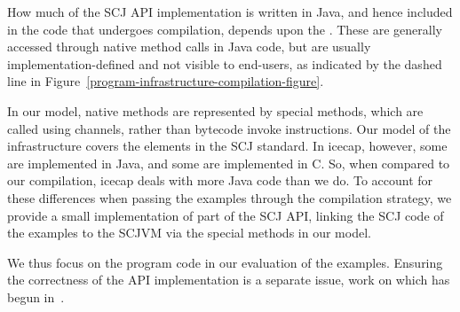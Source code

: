How much of the SCJ API implementation is written in Java, and hence
included in the code that undergoes compilation, depends upon the
.
These are generally accessed through native method calls in Java code,
but are usually implementation-defined and not visible to end-users,
as indicated by the dashed line in
Figure~\ref{program-infrastructure-compilation-figure}.

In our model, native methods are represented by special methods, which
are called using channels, rather than bytecode invoke instructions.
Our model of the infrastructure covers the elements in the SCJ
standard. 
In icecap, however, some are implemented in Java, and some are
implemented in C. 
So, when compared to our compilation, icecap deals with more Java code
than we do.
To account for these differences when passing the examples through the
compilation strategy, we provide a small implementation of part of the
SCJ API, linking the SCJ code of the examples to the SCJVM via the
special methods in our model.

We thus focus on the program code in our evaluation of the examples.
Ensuring the correctness of the API implementation is a separate
issue, work on which has begun in~\cite{freitas2016}.

